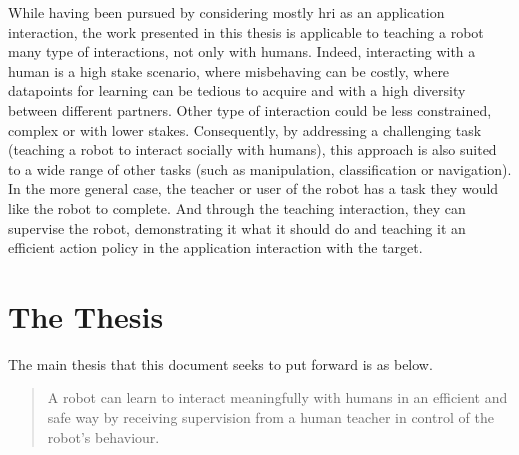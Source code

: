 While having been pursued by considering mostly \gls{hri} as an application interaction, the work presented in this thesis is applicable to teaching a robot many type of interactions, not only with humans. Indeed, interacting with a human is a high stake scenario, where misbehaving can be costly, where datapoints for learning can be tedious to acquire and with a high diversity between different partners. Other type of interaction could be less constrained, complex or with lower stakes. Consequently, by addressing a challenging task (teaching a robot to interact socially with humans), this approach is also suited to a wide range of other tasks (such as manipulation, classification or navigation). In the more general case, the teacher or user of the robot has a task they would like the robot to complete. And through the teaching interaction, they can supervise the robot, demonstrating it what it should do and teaching it an efficient action policy in the application interaction with the target. 




\section{The Thesis}\label{sec:intro-thesis}
The main thesis that this document seeks to put forward is as below.
\begin{quote}
	A robot can learn to interact meaningfully with humans in an efficient and safe way by receiving supervision from a human teacher in control of the robot's behaviour. 
\end{quote}

